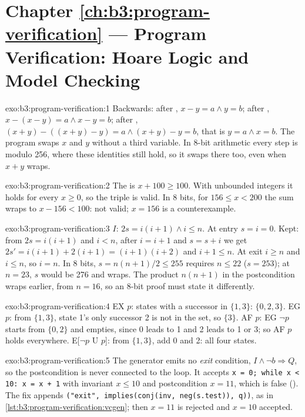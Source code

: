 \section*{Chapter \ref{ch:b3:program-verification} --- Program Verification: Hoare Logic and Model Checking}

\begin{solution}{exo:b3:program-verification:1}
Backwards: after , $x - y = a \wedge y = b$; after , $x - (x - y) = a \wedge x - y = b$; after , $(x + y) - ((x + y) - y) = a \wedge (x + y) - y = b$, that is $y = a \wedge x = b$. The program swaps $x$ and $y$ without a third variable. In 8-bit arithmetic every step is modulo 256, where these identities still hold, so it swaps there too, even when $x + y$ wraps.
\end{solution}

\begin{solution}{exo:b3:program-verification:2}
The  is $x + 100 \ge 100$. With unbounded integers it holds for every $x \ge 0$, so the triple is valid. In 8 bits, for $156 \le x < 200$ the sum wraps to $x - 156 < 100$: not valid; $x = 156$ is a counterexample.
\end{solution}

\begin{solution}{exo:b3:program-verification:3}
$I$: $2s = i(i + 1) \wedge i \le n$. At entry $s = i = 0$. Kept: from $2s = i(i + 1)$ and $i < n$, after $i = i + 1$ and $s = s + i$ we get $2s' = i(i + 1) + 2(i + 1) = (i + 1)(i + 2)$ and $i + 1 \le n$. At exit $i \ge n$ and $i \le n$, so $i = n$. In 8 bits, $s = n(n + 1)/2 \le 255$ requires $n \le 22$ ($s = 253$); at $n = 23$, $s$ would be 276 and wraps. The product $n(n + 1)$ in the postcondition wraps earlier, from $n = 16$, so an 8-bit proof must state it differently.
\end{solution}

\begin{solution}{exo:b3:program-verification:4}
EX $p$: states with a successor in $\{1, 3\}$: $\{0, 2, 3\}$. EG $p$: from $\{1, 3\}$, state 1's only successor 2 is not in the set, so $\{3\}$. AF $p$: EG $\neg p$ starts from $\{0, 2\}$ and empties, since 0 leads to 1 and 2 leads to 1 or 3; so AF $p$ holds everywhere. E[$\neg p$ U $p$]: from $\{1, 3\}$, add 0 and 2: all four states.
\end{solution}

\begin{solution}{exo:b3:program-verification:5}
The generator emits no \emph{exit} condition, $I \wedge \neg b \Rightarrow Q$, so the postcondition is never connected to the loop. It accepts \texttt{x = 0; while x < 10:\ x = x + 1} with invariant $x \le 10$ and postcondition $x = 11$, which is false (). The fix appends \texttt{("exit", implies(conj(inv, neg(s.test)), q))}, as in \cref{lst:b3:program-verification:vcgen}; then $x = 11$ is rejected and $x = 10$ accepted.
\end{solution}

